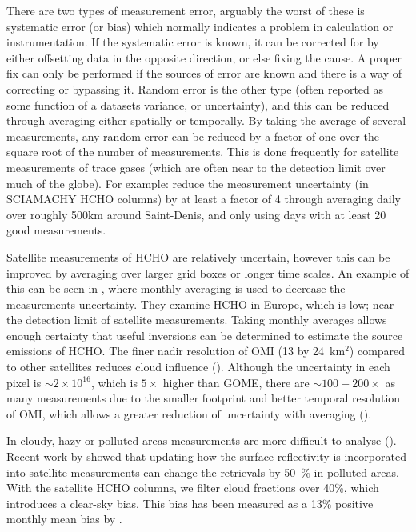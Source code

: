       There are two types of measurement error, arguably the worst of these is systematic error (or bias) which normally indicates a problem in calculation or instrumentation.
      If the systematic error is known, it can be corrected for by either offsetting data in the opposite direction, or else fixing the cause.
      A proper fix can only be performed if the sources of error are known and there is a way of correcting or bypassing it.
      Random error is the other type (often reported as some function of a datasets variance, or uncertainty), and this can be reduced through averaging either spatially or temporally. 
      By taking the average of several measurements, any random error can be reduced by a factor of one over the square root of the number of measurements.
      This is done frequently for satellite measurements of trace gases (which are often near to the detection limit over much of the globe).
      For example: \textcite{Vigouroux2009} reduce the measurement uncertainty (in SCIAMACHY HCHO columns) by at least a factor of 4 through averaging daily over roughly 500km around Saint-Denis, and only using days with at least 20 good measurements.
      
      Satellite measurements of HCHO are relatively uncertain, however this can be improved by averaging over larger grid boxes or longer time scales.
      An example of this can be seen in \textcite{Dufour2009}, where monthly averaging is used to decrease the measurements uncertainty.
      They examine HCHO in Europe, which is low; near the detection limit of satellite measurements.
      Taking monthly averages allows enough certainty that useful inversions can be determined to estimate the source emissions of HCHO.
      The finer nadir resolution of OMI (13 by 24~km${^2}$) compared to other satellites reduces cloud influence (\textcite{Millet2006, Millet2008}). 
      Although the uncertainty in each pixel is $\sim 2 \times 10^{16}$, which is $5 \times$ higher than GOME, there are $\sim 100-200 \times $ as many measurements due to the smaller footprint and better temporal resolution of OMI, which allows a greater reduction of uncertainty with averaging (\textcite{Chance2002,Millet2008}).
      
      In cloudy, hazy or polluted areas measurements are more difficult to analyse (\cite[e.g.][]{Palmer2003,Marais2014}).
      Recent work by \textcite{Vasilkov2017} showed that updating how the surface reflectivity is incorporated into satellite measurements can change the retrievals by 50~\% in polluted areas.
      With the satellite HCHO columns, we filter cloud fractions over 40\%, which introduces a clear-sky bias.
      This bias has been measured as a 13\% positive monthly mean bias by \textcite{Palmer2001, Surl2018}.
      
